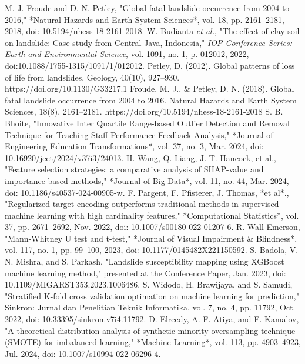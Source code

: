 \documentclass[conference]{IEEEtran}
\begin{document}
\begin{thebibliography}{00} 
 M. J. Froude and D. N. Petley, "Global fatal landslide occurrence from 2004 to 2016," *Natural Hazards and Earth System Sciences*, vol. 18, pp. 2161–2181, 2018, doi: 10.5194/nhess-18-2161-2018.
 W. Budianta \emph{et al.}, "The effect of clay-soil on landslide: Case study from Central Java, Indonesia," \emph{IOP Conference Series: Earth and Environmental Science}, vol. 1091, no. 1, p. 012012, 2022, doi:10.1088/1755-1315/1091/1/012012.
 Petley, D. (2012). Global patterns of loss of life from landslides. Geology, 40(10), 927–930. https://doi.org/10.1130/G33217.1
 Froude, M. J., \& Petley, D. N. (2018). Global fatal landslide occurrence from 2004 to 2016. Natural Hazards and Earth System Sciences, 18(8), 2161–2181. https://doi.org/10.5194/nhess-18-2161-2018
 S. B. Bhoite, "Innovative Inter Quartile Range-based Outlier Detection and Removal Technique for Teaching Staff Performance Feedback Analysis," *Journal of Engineering Education Transformations*, vol. 37, no. 3, Mar. 2024, doi: 10.16920/jeet/2024/v37i3/24013.
 H. Wang, Q. Liang, J. T. Hancock, et al., "Feature selection strategies: a comparative analysis of SHAP-value and importance-based methods," *Journal of Big Data*, vol. 11, no. 44, Mar. 2024, doi: 10.1186/s40537-024-00905-w.
 F. Pargent, F. Pfisterer, J. Thomas, *et al*., "Regularized target encoding outperforms traditional methods in supervised machine learning with high cardinality features," *Computational Statistics*, vol. 37, pp. 2671–2692, Nov. 2022, doi: 10.1007/s00180-022-01207-6.
 R. Wall Emerson, "Mann-Whitney U test and t-test," *Journal of Visual Impairment \& Blindness*, vol. 117, no. 1, pp. 99–100, 2023, doi: 10.1177/0145482X221150592.
 S. Badola, V. N. Mishra, and S. Parkash, "Landslide susceptibility mapping using XGBoost machine learning method," presented at the Conference Paper, Jan. 2023, doi: 10.1109/MIGARST353.2023.1006486.
 S. Widodo, H. Brawijaya, and S. Samudi, "Stratified K-fold cross validation optimation on machine learning for prediction," Sinkron: Jurnal dan Penelitian Teknik Informatika, vol. 7, no. 4, pp. 11792, Oct. 2022, doi: 10.33395/sinkron.v7i4.11792.
 D. Elreedy, A. F. Atiya, and F. Kamalov, "A theoretical distribution analysis of synthetic minority oversampling technique (SMOTE) for imbalanced learning," *Machine Learning*, vol. 113, pp. 4903–4923, Jul. 2024, doi: 10.1007/s10994-022-06296-4.

\end{thebibliography}
\end{document}
